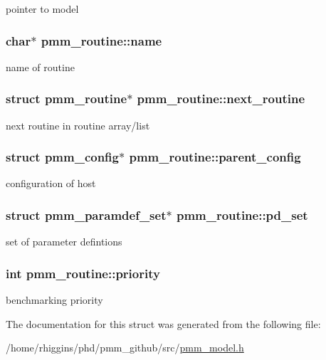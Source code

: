 pointer to model \hypertarget{structpmm__routine_a521a61160c00c9adb1eba49b7dd757ae}{
\subsubsection[{name}]{\setlength{\rightskip}{0pt plus 5cm}char$\ast$ pmm\-\_\-routine\-::name}}\label{structpmm__routine_a521a61160c00c9adb1eba49b7dd757ae}
name of routine \hypertarget{structpmm__routine_a0867b006cd2a3f1dfc332fd8fd2f5ec4}{
\subsubsection[{next\-\_\-routine}]{\setlength{\rightskip}{0pt plus 5cm}struct {\bf pmm\-\_\-routine}$\ast$ pmm\-\_\-routine\-::next\-\_\-routine}}\label{structpmm__routine_a0867b006cd2a3f1dfc332fd8fd2f5ec4}
next routine in routine array/list \hypertarget{structpmm__routine_a2169ce86ef3483856130ac7a1d523931}{
\subsubsection[{parent\-\_\-config}]{\setlength{\rightskip}{0pt plus 5cm}struct {\bf pmm\-\_\-config}$\ast$ pmm\-\_\-routine\-::parent\-\_\-config}}\label{structpmm__routine_a2169ce86ef3483856130ac7a1d523931}
configuration of host \hypertarget{structpmm__routine_afc1739e7dd564019db164b2b1b729e2d}{
\subsubsection[{pd\-\_\-set}]{\setlength{\rightskip}{0pt plus 5cm}struct {\bf pmm\-\_\-paramdef\-\_\-set}$\ast$ pmm\-\_\-routine\-::pd\-\_\-set}}\label{structpmm__routine_afc1739e7dd564019db164b2b1b729e2d}
set of parameter defintions \hypertarget{structpmm__routine_a58c57e2623c560c895b6fef809c20fd5}{
\subsubsection[{priority}]{\setlength{\rightskip}{0pt plus 5cm}int pmm\-\_\-routine\-::priority}}\label{structpmm__routine_a58c57e2623c560c895b6fef809c20fd5}
benchmarking priority 

The documentation for this struct was generated from the following file\-:\begin{DoxyCompactItemize}
\item 
/home/rhiggins/phd/pmm\-\_\-github/src/\hyperlink{pmm__model_8h}{pmm\-\_\-model.\-h}\end{DoxyCompactItemize}
